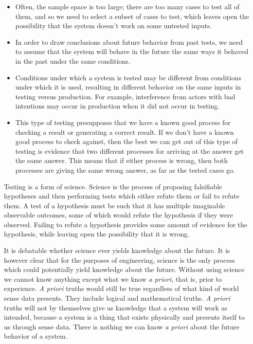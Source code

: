 \documentclass[11pt]{article}
\begin{document}
\begin{itemize}
	\item Often, the sample space is too large; there are too many cases to test all
		of them, and so we need to select a subset of cases to test, which leaves
		open the possibility that the system doesn't work on some untested inputs.
	\item In order to draw conclusions about future behavior from past tests, we need
		to assume that the system will behave in the future the same ways it behaved
		in the past under the same conditions.
	\item Conditions under which a system is tested may be different from conditions
		under which it is used, resulting in different behavior on the same inputs
		in testing versus production. For example, interference from actors with
		bad intentions may occur in production when it did not occur in testing.
	\item This type of testing presupposes that we have a known good process for checking
		a result or generating a correct result. If we don't have a known good process
		to check against, then the best we can get out of this type of testing is
		evidence that two different processes for arriving at the answer get the
		same answer. This means that if either process is wrong, then both processes
		are giving the same wrong answer, as far as the tested cases go.
\end{itemize}

Testing is a form of science. Science is the process of proposing falsifiable hypotheses and
then performing tests which either refute them or fail to refute them.
A test of a hypothesis must be such that it has multiple imaginable observable outcomes,
some of which would refute the hypothesis if they were observed.
Failing to refute a hypothesis provides some amount of evidence for the hypothesis, 
while leaving open the possibility that it is wrong.

It is debatable whether science ever yields knowledge about the future. It is however clear
that for the purposes of engineering, science is the only process which could potentially
yield knowledge about the future. Without using science we cannot know anything except
what we know \emph{a priori}, that is, prior to experience. \emph{A priori}\/ truths would
still be true regardless of what kind of world sense data presents. They include logical
and mathematical truths. \emph{A priori}\/ truths will not by themselves give us knowledge
that a system will work as intended, because a system is a thing that exists physically and
presents itself to us through sense data. There is nothing we can know \emph{a priori}\/
about the future behavior of a system.
\end{document}
